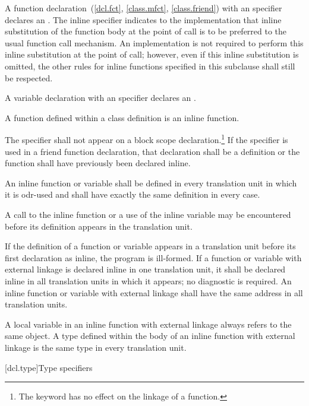 \pnum
{}%
%
A function declaration~(\ref{dcl.fct}, \ref{class.mfct},
\ref{class.friend}) with an  specifier declares an
. The inline specifier indicates to
the implementation that inline substitution of the function body at the
point of call is to be preferred to the usual function call mechanism.
An implementation is not required to perform this inline substitution at
the point of call; however, even if this inline substitution is omitted,
the other rules for inline functions specified in this subclause shall
still be respected.

\pnum
A variable declaration with an  specifier declares an
.

\pnum
A function defined within a class definition is an inline function.

\pnum
The  specifier shall not appear on a block scope
declaration.\footnote{The  keyword has no effect on the linkage of a function.}
If the  specifier is used in a friend function declaration, that
declaration shall be a definition or the function shall have previously
been declared inline.

\pnum
An inline function or variable shall be defined in every translation unit in which
it is odr-used and shall have exactly the same definition in every
case.
\begin{note}
A call to the inline function or a use of the inline variable may be encountered before its definition
appears in the translation unit.
\end{note}
If the definition of a function or variable appears in a translation unit before its
first declaration as inline, the program is ill-formed. If a function or variable
with external linkage is declared inline in one translation unit, it
shall be declared inline in all translation units in which it appears;
no diagnostic is required. An inline function or variable with external
linkage shall have the same address in all translation units.
\begin{note}
A  local variable in an inline
function with external linkage always refers to the same object.
A type defined within the body of an inline
function with external linkage is the
same type in every translation unit.
\end{note}

[dcl.type]{Type specifiers}%


